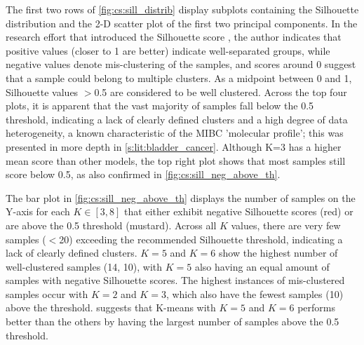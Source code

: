 The first two rows of \cref{fig:cs:sill_distrib} display subplots containing the Silhouette distribution and the 2-D scatter plot of the first two principal components. In the research effort that introduced the Silhouette score \citep{Rousseeuw1987-wy}, the author indicates that positive values (closer to 1 are better) indicate well-separated groups, while negative values denote mis-clustering of the samples, and scores around 0 suggest that a sample could belong to multiple clusters. As a midpoint between 0 and 1, Silhouette values $>$0.5 are considered to be well clustered. Across the top four plots, it is apparent that the vast majority of samples fall below the 0.5 threshold, indicating a lack of clearly defined clusters and a high degree of data heterogeneity, a known characteristic of the MIBC 'molecular profile'; this was presented in more depth in \cref{s:lit:bladder_cancer}. Although K=3 has a higher mean score than other models, the top right plot shows that most samples still score below 0.5, as also confirmed in \cref{fig:cs:sill_neg_above_th}.


The bar plot in \cref{fig:cs:sill_neg_above_th} displays the number of samples on the Y-axis for each $K \in [3, 8]$ that either exhibit negative Silhouette scores (red) or are above the 0.5 threshold (mustard). Across all $K$ values, there are very few samples ($<$20) exceeding the recommended Silhouette threshold, indicating a lack of clearly defined clusters. $K=5$ and $K=6$ show the highest number of well-clustered samples (14, 10), with $K=5$ also having an equal amount of samples with negative Silhouette scores. The highest instances of mis-clustered samples occur with $K=2$ and $K=3$, which also have the fewest samples (10) above the threshold.  suggests that K-means with $K=5$ and $K=6$ performs better than the others by having the largest number of samples above the 0.5 threshold.


